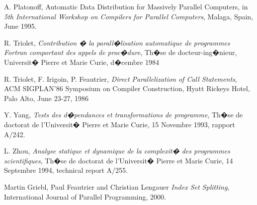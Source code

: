 \documentclass[a4paper]{report}
\begin{document}
\begin{thebibliography}{99}
 A. Platonoff, Automatic Data Distribution for Massively
  Parallel Computers, in {\em 5th International Workshop on Compilers for
  Parallel Computers}, Malaga, Spain, June 1995.

   R. Triolet,
{\em Contribution � la parall�lisation automatique de programmes
Fortran comportant des appels de proc�dure},
Th�se de docteur-ing�nieur, Universit� Pierre et Marie Curie,
d�cembre 1984

   R. Triolet, F. Irigoin, P. Feautrier,
{\em Direct Parallelization of Call Statements},
ACM SIGPLAN'86 Symposium on Compiler Construction, Hyatt Rickeys Hotel, Palo
Alto, June 23-27, 1986

   Y. Yang,
{\em Tests des d�pendances et transformations de programme},
Th�se de doctorat de l'Universit� Pierre et Marie Curie,
15 Novembre 1993, rapport A/242.

   L. Zhou,
{\em Analyse
statique et dynamique de la complexit� des programmes
scientifiques},
Th�se de doctorat de l'Universit� Pierre et Marie Curie,
14 Septembre 1994, technical report A/255.

   Martin Griebl, Paul Feautrier and Christian Lengauer
{\em Index Set Splitting},
International Journal of Parallel Programming, 2000.

\end{thebibliography}

\newpage


\printindex
\end{document}
